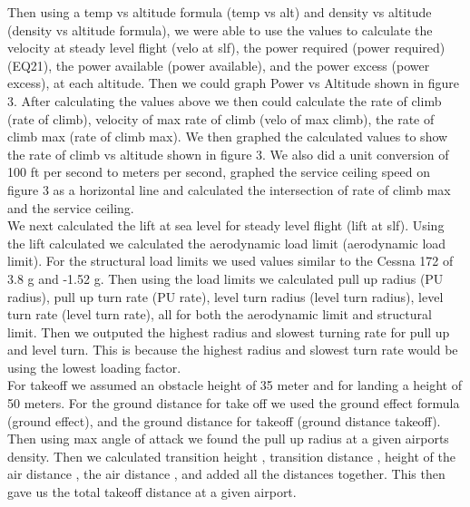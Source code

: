 \documentclass[12pt,A4paper]{article}
\begin{document}
	\indent Then using a temp vs altitude formula (temp vs alt) and density vs altitude (density vs altitude formula), we were able to use the values to calculate the velocity at steady level flight (velo at slf), the power required (power required)(EQ21), the power available (power available), and the power excess (power excess), at each altitude. Then we could graph Power vs Altitude shown in figure 3. After calculating the values above we then could calculate the rate of climb (rate of climb), velocity of max rate of climb (velo of max climb), the rate of climb max (rate of climb max). We then graphed the calculated values to show the rate of climb vs altitude shown in figure 3. We also did a unit conversion of 100 ft per second to meters per second, graphed the service ceiling speed on figure 3 as a horizontal line and calculated the intersection of rate of climb max and the service ceiling. \\
	\indent We next calculated the lift at sea level for steady level flight (lift at slf). Using the lift calculated we calculated the aerodynamic load limit (aerodynamic load limit). For the structural load limits we used values similar to the Cessna 172 of 3.8 g and -1.52 g. Then using the load limits we calculated pull up radius (PU radius), pull up turn rate (PU rate), level turn radius (level turn radius), level turn rate (level turn rate), all for both the aerodynamic limit and structural limit. Then we outputed the highest radius and slowest turning rate for pull up and level turn. This is because the highest radius and slowest turn rate would be using the lowest loading factor. \\
	\indent For takeoff we assumed an obstacle height of 35 meter and for landing a height of 50 meters. For the ground distance for take off we used the ground effect formula (ground effect), and the ground distance for takeoff (ground distance takeoff). Then using max angle of attack we found the pull up radius at a given airports density. Then we calculated transition height , transition distance , height of the air distance , the air distance , and added all the distances together. This then gave us the total takeoff distance at a given airport.
	
\end{document}
